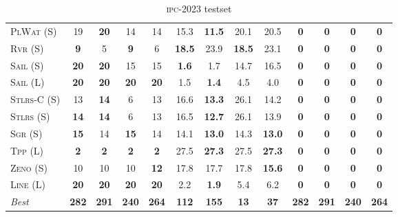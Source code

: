 \begin{table}[tb]
{\begin{tabular}{|l||cccc||cccc||cccc||}
\textsc{PlWat} (S)&19&\textbf{20}&14&14&15.3&\textbf{11.5}&20.1&20.5&\textbf{0}&\textbf{0}&\textbf{0}&\textbf{0}\\
\textsc{Rvr} (S)&\textbf{9}&5&\textbf{9}&6&\textbf{18.5}&23.9&\textbf{18.5}&23.1&\textbf{0}&\textbf{0}&\textbf{0}&\textbf{0}\\
\textsc{Sail} (S)&\textbf{20}&\textbf{20}&15&15&\textbf{1.6}&1.7&14.7&16.5&\textbf{0}&\textbf{0}&\textbf{0}&\textbf{0}\\
\textsc{Sail} (L)&\textbf{20}&\textbf{20}&\textbf{20}&\textbf{20}&1.5&\textbf{1.4}&4.5&4.0&\textbf{0}&\textbf{0}&\textbf{0}&\textbf{0}\\
\textsc{Stlrs-C} (S)&13&\textbf{14}&6&13&16.6&\textbf{13.3}&26.1&14.2&\textbf{0}&\textbf{0}&\textbf{0}&\textbf{0}\\
\textsc{Stlrs} (S)&\textbf{14}&\textbf{14}&6&13&16.5&\textbf{12.7}&26.1&13.9&\textbf{0}&\textbf{0}&\textbf{0}&\textbf{0}\\
\textsc{Sgr} (S)&\textbf{15}&14&\textbf{15}&14&14.1&\textbf{13.0}&14.3&\textbf{13.0}&\textbf{0}&\textbf{0}&\textbf{0}&\textbf{0}\\
\textsc{Tpp} (L)&\textbf{2}&\textbf{2}&\textbf{2}&\textbf{2}&27.5&\textbf{27.3}&27.5&\textbf{27.3}&\textbf{0}&\textbf{0}&\textbf{0}&\textbf{0}\\
\textsc{Zeno} (S)&10&10&10&\textbf{12}&17.8&17.7&17.8&\textbf{15.6}&\textbf{0}&\textbf{0}&\textbf{0}&\textbf{0}\\
\textsc{Line} (L)&\textbf{20}&\textbf{20}&\textbf{20}&\textbf{20}&2.2&\textbf{1.9}&5.4&6.2&\textbf{0}&\textbf{0}&\textbf{0}&\textbf{0}
\\\hline
\textit{Best}&\textbf{282}&\textbf{291}&\textbf{240}&\textbf{264}&\textbf{112}&\textbf{155}&\textbf{13}&\textbf{37}&\textbf{282}&\textbf{291}&\textbf{240}&\textbf{264}\\\hline

        \end{tabular}}
        \caption{\textsc{ipc}-2023 testset}
        \label{tab:ipc}
        \end{table}
        